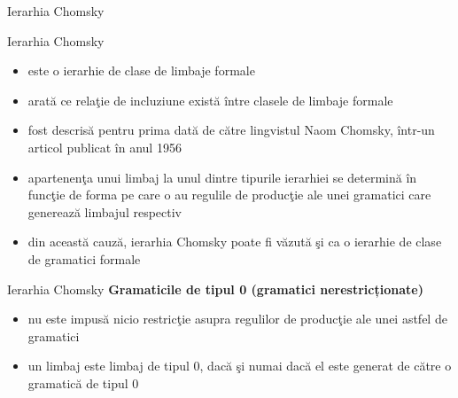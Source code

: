 \documentclass[pdf]{beamer}
\begin{document}
\begin{frame}{Ierarhia Chomsky}
\begin{figure}[H]
\centering
{}
\end{figure}
\end{frame}



\begin{frame}{Ierarhia Chomsky}
\begin{itemize}
\item
este o ierarhie de clase de limbaje formale
\item
arată ce relaţie de incluziune există între clasele de limbaje formale
\item
fost descrisă pentru prima dată de către lingvistul Naom Chomsky, într-un articol publicat în anul 1956
\item
apartenenţa unui limbaj la unul dintre tipurile ierarhiei se determină în funcţie de forma pe care o au regulile de producţie ale unei gramatici care generează limbajul respectiv
\item
din această cauză, ierarhia Chomsky poate fi văzută şi ca o ierarhie de clase de gramatici formale
\end{itemize}
\end{frame}



\begin{frame}{Ierarhia Chomsky}
\textbf{Gramaticile de tipul 0 (gramatici nerestricționate)}
\begin{itemize}
\item
nu este impusă nicio restricţie asupra regulilor de producţie ale unei astfel de gramatici
\item
un limbaj este limbaj de tipul 0, dacă şi numai dacă el este generat de către o gramatică de tipul 0
\end{itemize}
\end{frame}
\end{document}
